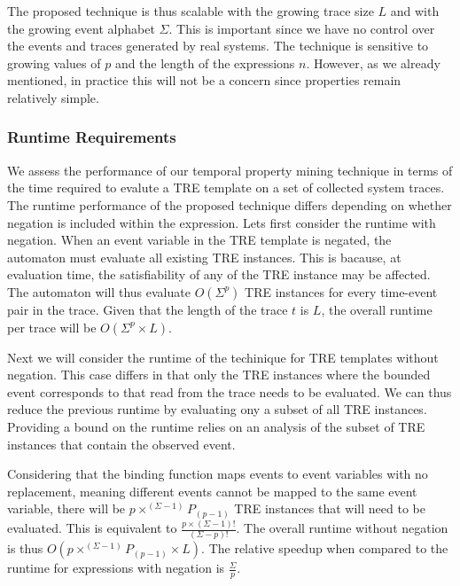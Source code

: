 \documentclass[]{sigplanconf}
\begin{document}

The proposed technique is thus scalable with the growing trace size $L$ and with the growing event alphabet $\Sigma$. This is important since we have no control over the events and traces generated by real systems. The technique is sensitive to growing values of $p$ and the length of the expressions $n$. However, as we already mentioned, in practice this will not be a concern since properties remain relatively simple.

\subsubsection{Runtime Requirements}

We assess the performance of our temporal property mining technique in terms of the time required to evalute a TRE template on a set of collected system traces.
The runtime performance of the proposed technique differs depending on whether negation is included within the expression.
Lets first consider the runtime with negation. When an event variable in the TRE template is negated, the automaton must evaluate all existing TRE instances. This is bacause, at evaluation time, the satisfiability of any of the TRE instance may be affected. The automaton will thus evaluate $O(\Sigma^p)$ TRE instances for every time-event pair in the trace. Given that the length of the trace $t$ is $L$, the overall runtime per trace will be $O(\Sigma^p \times L)$.

Next we will consider the runtime of the techinique for TRE templates without negation. This case differs in that only the TRE instances where the bounded event corresponds to that read from the trace needs to be evaluated. We can thus reduce the previous runtime by evaluating ony a subset of all TRE instances. Providing a bound on the runtime relies on an analysis of the subset of TRE instances that contain the observed event.

Considering that the binding function maps events to event variables with no replacement, meaning different events cannot be mapped to the same event variable, there will be $p \times ^{(\Sigma - 1)}P_{(p - 1)}$ TRE instances that will need to be evaluated. This is equivalent to $\frac{p \times (\Sigma - 1)!}{(\Sigma - p)!}$. The overall runtime without negation is thus
$O(p \times ^{(\Sigma - 1)}P_{(p - 1)} \times L)$. The relative speedup when compared to the runtime for expressions with negation is $\frac{\Sigma}{p}$.
\end{document}
